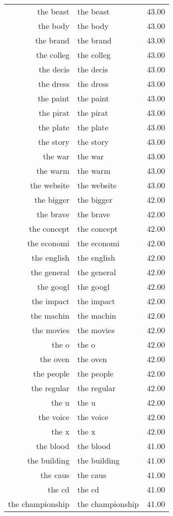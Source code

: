 \begin{table}[ht]
\begin{tabular}{rlr}
  the beast & the beast & 43.00 \\ 
  the body & the body & 43.00 \\ 
  the brand & the brand & 43.00 \\ 
  the colleg & the colleg & 43.00 \\ 
  the decis & the decis & 43.00 \\ 
  the dress & the dress & 43.00 \\ 
  the paint & the paint & 43.00 \\ 
  the pirat & the pirat & 43.00 \\ 
  the plate & the plate & 43.00 \\ 
  the story & the story & 43.00 \\ 
  the war & the war & 43.00 \\ 
  the warm & the warm & 43.00 \\ 
  the website & the website & 43.00 \\ 
  the bigger & the bigger & 42.00 \\ 
  the brave & the brave & 42.00 \\ 
  the concept & the concept & 42.00 \\ 
  the economi & the economi & 42.00 \\ 
  the english & the english & 42.00 \\ 
  the general & the general & 42.00 \\ 
  the googl & the googl & 42.00 \\ 
  the impact & the impact & 42.00 \\ 
  the machin & the machin & 42.00 \\ 
  the movies & the movies & 42.00 \\ 
  the o & the o & 42.00 \\ 
  the oven & the oven & 42.00 \\ 
  the people & the people & 42.00 \\ 
  the regular & the regular & 42.00 \\ 
  the u & the u & 42.00 \\ 
  the voice & the voice & 42.00 \\ 
  the x & the x & 42.00 \\ 
  the blood & the blood & 41.00 \\ 
  the building & the building & 41.00 \\ 
  the caus & the caus & 41.00 \\ 
  the cd & the cd & 41.00 \\ 
  the championship & the championship & 41.00 \\ 

\end{tabular}
\end{table}

